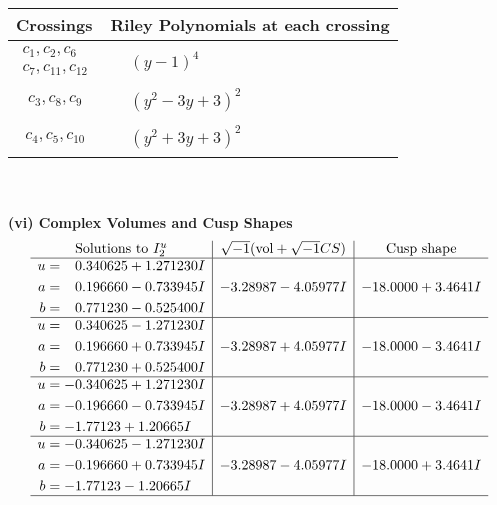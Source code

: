 \documentclass[1p]{elsarticle_modified}
\theoremstyle{definition}
\newcommand{\I}{\sqrt{-1}}
\begin{document}
\begin{tabular}{m{50pt}|m{274pt}}
Crossings & \hspace{64pt}Riley Polynomials at each crossing \\
\hline $$\begin{aligned}c_{1},c_{2},c_{6}\\c_{7},c_{11},c_{12}\end{aligned}$$&$\begin{aligned}
&(y-1)^4
\end{aligned}$\\
\hline $$\begin{aligned}c_{3},c_{8},c_{9}\end{aligned}$$&$\begin{aligned}
&(y^2-3 y+3)^2
\end{aligned}$\\
\hline $$\begin{aligned}c_{4},c_{5},c_{10}\end{aligned}$$&$\begin{aligned}
&(y^2+3 y+3)^2
\end{aligned}$\\
\hline
\end{tabular}\\~\\
\newpage\flushleft \textbf{(vi) Complex Volumes and Cusp Shapes}
$$\begin{array}{c|c|c}  
\text{Solutions to }I^u_{2}& \I (\text{vol} + \sqrt{-1}CS) & \text{Cusp shape}\\
 \hline 
\begin{aligned}
u &= \phantom{-}0.340625 + 1.271230 I \\
a &= \phantom{-}0.196660 - 0.733945 I \\
b &= \phantom{-}0.771230 - 0.525400 I\end{aligned}
 & -3.28987 - 4.05977 I & -18.0000 + 3.4641 I \\ \hline\begin{aligned}
u &= \phantom{-}0.340625 - 1.271230 I \\
a &= \phantom{-}0.196660 + 0.733945 I \\
b &= \phantom{-}0.771230 + 0.525400 I\end{aligned}
 & -3.28987 + 4.05977 I & -18.0000 - 3.4641 I \\ \hline\begin{aligned}
u &= -0.340625 + 1.271230 I \\
a &= -0.196660 - 0.733945 I \\
b &= -1.77123 + 1.20665 I\end{aligned}
 & -3.28987 + 4.05977 I & -18.0000 - 3.4641 I \\ \hline\begin{aligned}
u &= -0.340625 - 1.271230 I \\
a &= -0.196660 + 0.733945 I \\
b &= -1.77123 - 1.20665 I\end{aligned}
 & -3.28987 - 4.05977 I & -18.0000 + 3.4641 I\\
 \hline 
 \end{array}$$\newpage\newpage\renewcommand{\arraystretch}{1}
\end{document}
